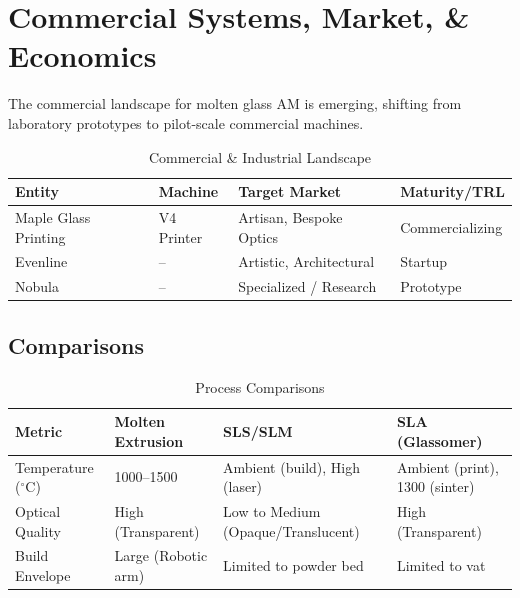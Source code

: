 \section{Commercial Systems, Market, \& Economics}
The commercial landscape for molten glass AM is emerging, shifting from laboratory prototypes to pilot-scale commercial machines.

\begin{table}[h]
\centering
\caption{Commercial \& Industrial Landscape}
\begin{tabularx}{\textwidth}{l l X l}
\toprule
\textbf{Entity} & \textbf{Machine} & \textbf{Target Market} & \textbf{Maturity/TRL} \\
\midrule
Maple Glass Printing & V4 Printer & Artisan, Bespoke Optics & Commercializing \\
Evenline & -- & Artistic, Architectural & Startup \\
Nobula & -- & Specialized / Research & Prototype \\
\bottomrule
\end{tabularx}
\end{table}

\subsection{Comparisons}
\begin{table}[h]
\centering
\caption{Process Comparisons}
\begin{tabularx}{\textwidth}{l l l l}
\toprule
\textbf{Metric} & \textbf{Molten Extrusion} & \textbf{SLS/SLM} & \textbf{SLA (Glassomer)} \\
\midrule
Temperature ($^\circ$C) & 1000--1500 & Ambient (build), High (laser) & Ambient (print), 1300 (sinter) \\
Optical Quality & High (Transparent) & Low to Medium (Opaque/Translucent) & High (Transparent) \\
Build Envelope & Large (Robotic arm) & Limited to powder bed & Limited to vat \\
\bottomrule
\end{tabularx}
\end{table}
